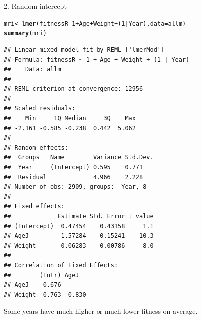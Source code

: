 \documentclass[12pt,a4paper]{scrartcl}\usepackage[]{graphicx}\usepackage[]{color}
\makeatletter
\newcommand{\hlnum}[1]{\textcolor[rgb]{0.686,0.059,0.569}{#1}}%
\newcommand{\hlopt}[1]{\textcolor[rgb]{0,0,0}{#1}}%
\newcommand{\hlstd}[1]{\textcolor[rgb]{0.345,0.345,0.345}{#1}}%
\newcommand{\hlkwb}[1]{\textcolor[rgb]{0.69,0.353,0.396}{#1}}%
\newcommand{\hlkwc}[1]{\textcolor[rgb]{0.333,0.667,0.333}{#1}}%
\newcommand{\hlkwd}[1]{\textcolor[rgb]{0.737,0.353,0.396}{\textbf{#1}}}%
\newenvironment{kframe}{%
 \def\at@end@of@kframe{}%
 \ifinner\ifhmode%
  \def\at@end@of@kframe{\end{minipage}}%
  \begin{minipage}{\columnwidth}%
 \fi\fi%
 \def\FrameCommand##1{\hskip\@totalleftmargin \hskip-\fboxsep
 \colorbox{shadecolor}{##1}\hskip-\fboxsep
     \hskip-\linewidth \hskip-\@totalleftmargin \hskip\columnwidth}%
 \MakeFramed {\advance\hsize-\width
   \@totalleftmargin\z@ \linewidth\hsize
   \@setminipage}}%
 {\par\unskip\endMakeFramed%
 \at@end@of@kframe}
\newenvironment{knitrout}{}{} %
\makeatother
\begin{document}
\begin{Answer}
2. Random intercept
\begin{knitrout}
\color{fgcolor}\begin{kframe}
\begin{alltt}
\hlstd{mri} \hlkwb{<-} \hlkwd{lmer}\hlstd{(fitnessR} \hlopt{~} \hlnum{1}\hlopt{+} \hlstd{Age}  \hlopt{+} \hlstd{Weight} \hlopt{+} \hlstd{(}\hlnum{1}\hlopt{|}\hlstd{Year),} \hlkwc{data} \hlstd{= allm)}
\hlkwd{summary}\hlstd{(mri)}
\end{alltt}
\begin{verbatim}
## Linear mixed model fit by REML ['lmerMod']
## Formula: fitnessR ~ 1 + Age + Weight + (1 | Year)
##    Data: allm
## 
## REML criterion at convergence: 12956
## 
## Scaled residuals: 
##    Min     1Q Median     3Q    Max 
## -2.161 -0.585 -0.238  0.442  5.062 
## 
## Random effects:
##  Groups   Name        Variance Std.Dev.
##  Year     (Intercept) 0.595    0.771   
##  Residual             4.966    2.228   
## Number of obs: 2909, groups:  Year, 8
## 
## Fixed effects:
##             Estimate Std. Error t value
## (Intercept)  0.47454    0.43158     1.1
## AgeJ        -1.57284    0.15241   -10.3
## Weight       0.06283    0.00786     8.0
## 
## Correlation of Fixed Effects:
##        (Intr) AgeJ  
## AgeJ   -0.676       
## Weight -0.763  0.830
\end{verbatim}
\end{kframe}
\end{knitrout}
Some years have much higher or much lower fitness on average.\\


\end{Answer}
\end{document}
